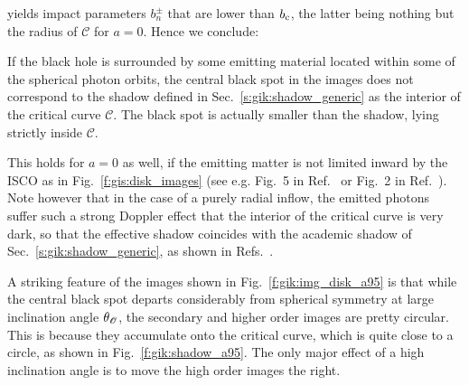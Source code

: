 yields impact parameters $b_n^\pm$ that are lower than $b_{\rm c}$, the latter being
nothing but the radius of $\mathscr{C}$ for $a=0$.
Hence we conclude:
\begin{prop}
If the black hole is surrounded by some emitting material
located within some of the spherical photon orbits,
the central black spot in the images does not correspond to
the shadow defined in Sec.~\ref{s:gik:shadow_generic} as the interior of the critical curve $\mathscr{C}$. The black spot is actually smaller than the shadow, lying strictly inside $\mathscr{C}$.
\end{prop}
This holds for $a=0$ as well, if the emitting matter is not limited inward by the ISCO
as in Fig.~\ref{f:gis:disk_images} (see e.g. Fig.~5 in Ref.~\cite{GrallHW19}
or Fig.~2 in Ref.~\cite{VinceWAGLPG21}). Note however that in the case of a
purely radial inflow, the emitted photons suffer such a strong Doppler effect that
the interior of the critical curve is very dark, so that the effective shadow
coincides with the academic shadow of Sec.~\ref{s:gik:shadow_generic},
as shown in Refs.~\cite{FalckMA00,NarayJG19}.


A striking feature of the images shown in Fig.~\ref{f:gik:img_disk_a95} is that
while the central black spot departs considerably from spherical symmetry at large
inclination angle $\theta_{\mathscr{O}}$, the secondary and higher order images are pretty
circular. This is because they accumulate onto the critical curve, which is
quite close to a circle, as shown in Fig.~\ref{f:gik:shadow_a95}. The only
major effect of a high inclination angle is to move the high order images
the right.

